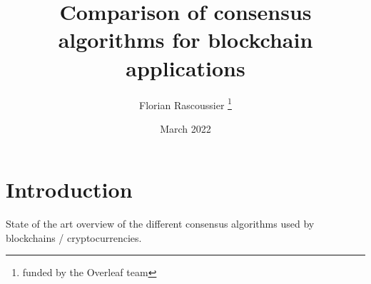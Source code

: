 \documentclass[12pt]{article} %
\title{Comparison of consensus algorithms for blockchain applications}
\author{Florian Rascoussier \thanks{funded by the Overleaf team}}
\date{March 2022}
\begin{document}

\newpage


\section{Introduction }
State of the art overview of the different consensus 
algorithms used by blockchains / cryptocurrencies.
\end{document}
